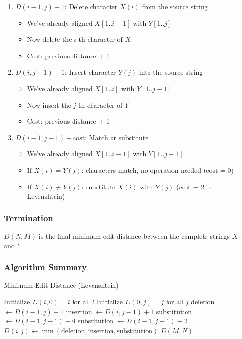 \documentclass[11pt,a4paper]{article}
\theoremstyle{definition}
\theoremstyle{plain}
\theoremstyle{remark}
\begin{document}
\begin{enumerate}
    \item \textbf{$D(i-1,j) + 1$}: Delete character $X(i)$ from the source string
    \begin{itemize}
        \item We've already aligned $X[1..i-1]$ with $Y[1..j]$
        \item Now delete the $i$-th character of $X$
        \item Cost: previous distance + 1
    \end{itemize}
    
    \item \textbf{$D(i,j-1) + 1$}: Insert character $Y(j)$ into the source string
    \begin{itemize}
        \item We've already aligned $X[1..i]$ with $Y[1..j-1]$
        \item Now insert the $j$-th character of $Y$
        \item Cost: previous distance + 1
    \end{itemize}
    
    \item \textbf{$D(i-1,j-1) + \text{cost}$}: Match or substitute
    \begin{itemize}
        \item We've already aligned $X[1..i-1]$ with $Y[1..j-1]$
        \item If $X(i) = Y(j)$: characters match, no operation needed (cost = 0)
        \item If $X(i) \neq Y(j)$: substitute $X(i)$ with $Y(j)$ (cost = 2 in Levenshtein)
    \end{itemize}
\end{enumerate}

\subsubsection{Termination}

$D(N,M)$ is the final minimum edit distance between the complete strings $X$ and $Y$.

\subsubsection{Algorithm Summary}

\begin{algorithm}
\caption{Minimum Edit Distance (Levenshtein)}
\begin{algorithmic}
\STATE Initialize $D(i,0) = i$ for all $i$
\STATE Initialize $D(0,j) = j$ for all $j$
        \STATE deletion $\leftarrow D(i-1,j) + 1$
        \STATE insertion $\leftarrow D(i,j-1) + 1$
            \STATE substitution $\leftarrow D(i-1,j-1) + 0$
        \ELSE
            \STATE substitution $\leftarrow D(i-1,j-1) + 2$
        \ENDIF
        \STATE $D(i,j) \leftarrow \min(\text{deletion}, \text{insertion}, \text{substitution})$
    \ENDFOR
\ENDFOR
\RETURN $D(M,N)$
\end{algorithmic}
\end{algorithm}
\end{document}

